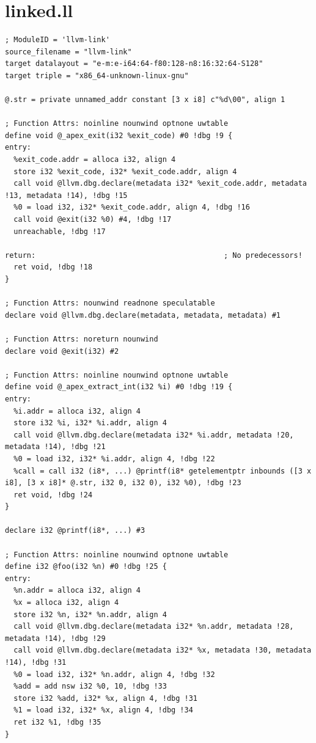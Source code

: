\documentclass[12pt, twoside]{fithesis2}
\renewcommand{\_}{\leavevmode \kern0.07em\vbox{\hrule width0.4em}}
\begin{document}
\chapter{linked.ll}
\label{appendix:linked}

\begin{verbatim}
; ModuleID = 'llvm-link'
source_filename = "llvm-link"
target datalayout = "e-m:e-i64:64-f80:128-n8:16:32:64-S128"
target triple = "x86_64-unknown-linux-gnu"

@.str = private unnamed_addr constant [3 x i8] c"%d\00", align 1

; Function Attrs: noinline nounwind optnone uwtable
define void @_apex_exit(i32 %exit_code) #0 !dbg !9 {
entry:
  %exit_code.addr = alloca i32, align 4
  store i32 %exit_code, i32* %exit_code.addr, align 4
  call void @llvm.dbg.declare(metadata i32* %exit_code.addr, metadata !13, metadata !14), !dbg !15
  %0 = load i32, i32* %exit_code.addr, align 4, !dbg !16
  call void @exit(i32 %0) #4, !dbg !17
  unreachable, !dbg !17

return:                                           ; No predecessors!
  ret void, !dbg !18
}

; Function Attrs: nounwind readnone speculatable
declare void @llvm.dbg.declare(metadata, metadata, metadata) #1

; Function Attrs: noreturn nounwind
declare void @exit(i32) #2

; Function Attrs: noinline nounwind optnone uwtable
define void @_apex_extract_int(i32 %i) #0 !dbg !19 {
entry:
  %i.addr = alloca i32, align 4
  store i32 %i, i32* %i.addr, align 4
  call void @llvm.dbg.declare(metadata i32* %i.addr, metadata !20, metadata !14), !dbg !21
  %0 = load i32, i32* %i.addr, align 4, !dbg !22
  %call = call i32 (i8*, ...) @printf(i8* getelementptr inbounds ([3 x i8], [3 x i8]* @.str, i32 0, i32 0), i32 %0), !dbg !23
  ret void, !dbg !24
}

declare i32 @printf(i8*, ...) #3

; Function Attrs: noinline nounwind optnone uwtable
define i32 @foo(i32 %n) #0 !dbg !25 {
entry:
  %n.addr = alloca i32, align 4
  %x = alloca i32, align 4
  store i32 %n, i32* %n.addr, align 4
  call void @llvm.dbg.declare(metadata i32* %n.addr, metadata !28, metadata !14), !dbg !29
  call void @llvm.dbg.declare(metadata i32* %x, metadata !30, metadata !14), !dbg !31
  %0 = load i32, i32* %n.addr, align 4, !dbg !32
  %add = add nsw i32 %0, 10, !dbg !33
  store i32 %add, i32* %x, align 4, !dbg !31
  %1 = load i32, i32* %x, align 4, !dbg !34
  ret i32 %1, !dbg !35
}


\end{verbatim}
\end{document}
